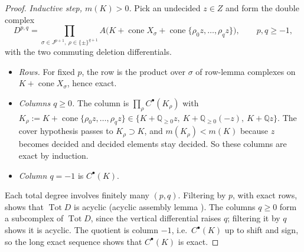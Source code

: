 \documentclass[11pt]{article}
\theoremstyle{definition}
\theoremstyle{remark}
\newcommand{\QQ}{\mathbb{Q}}
\newcommand{\cone}{\operatorname{cone}}
\begin{document}
\begin{proof}
\emph{Inductive step, $m(K)>0$.} Pick an undecided $z\in Z$ and form the double complex
\[
D^{p,q}=\prod_{\sigma\in J^{p+1},\ \rho\in\{\pm\}^{q+1}}A\bigl(K+\cone X_\sigma+\cone\{\rho_0z,\dots,\rho_qz\}\bigr),\qquad p,q\ge-1,
\]
with the two commuting deletion differentials.
\begin{itemize}
\item \emph{Rows.} For fixed $p$, the row is the product over $\sigma$ of row-lemma complexes on $K+\cone X_\sigma$, hence exact.
\item \emph{Columns $q\ge0$.} The column is $\prod_\rho C^\bullet(K_\rho)$ with $K_\rho:=K+\cone\{\rho_0z,\dots,\rho_qz\}\in\{K+\QQ_{\ge0}z,\ K+\QQ_{\ge0}(-z),\ K+\QQ z\}$. The cover hypothesis passes to $K_\rho\supset K$, and $m(K_\rho)<m(K)$ because $z$ becomes decided and decided elements stay decided. So these columns are exact by induction.
\item \emph{Column $q=-1$} is $C^\bullet(K)$.
\end{itemize}
Each total degree involves finitely many $(p,q)$. Filtering by $p$, with exact rows, shows that $\operatorname{Tot}D$ is acyclic (acyclic assembly lemma \cite[\S2.7]{Weibel}). The columns $q\ge0$ form a subcomplex of $\operatorname{Tot}D$, since the vertical differential raises $q$; filtering it by $q$ shows it is acyclic. The quotient is column $-1$, i.e.\ $C^\bullet(K)$ up to shift and sign, so the long exact sequence shows that $C^\bullet(K)$ is exact.
\end{proof}
\end{document}
